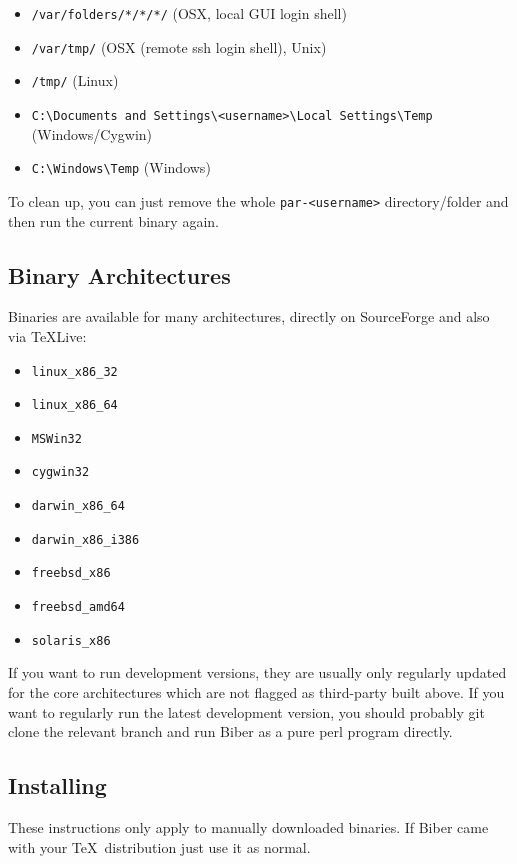 \documentclass{ltxdockit}
\begin{document}
\begin{itemize}
\item \verb+/var/folders/*/*/*/+ (OSX, local GUI login shell)
\item \verb+/var/tmp/+ (OSX (remote ssh login shell), Unix)
\item \verb+/tmp/+ (Linux)
\item \verb+C:\Documents and Settings\<username>\Local Settings\Temp+ (Windows/Cygwin)
\item \verb+C:\Windows\Temp+ (Windows)
\end{itemize}

\noindent To clean up, you can just remove the whole \verb+par-<username>+
directory/folder and then run the current binary again.

\subsection{Binary Architectures}

Binaries are available for many architectures, directly on SourceForge and
also via \TeX Live:

\begin{itemize}
\item \verb+linux_x86_32+
\item \verb+linux_x86_64+
\item \verb+MSWin32+
\item \verb+cygwin32+
\item \verb+darwin_x86_64+
\item \verb+darwin_x86_i386+
\item \verb+freebsd_x86+\tpb
\item \verb+freebsd_amd64+\tpb
\item \verb+solaris_x86+\tpb
\end{itemize}

\noindent If you want to run development versions, they are usually only
regularly updated for the core architectures which are not flagged as
third-party built above. If you want to regularly run the latest
development version, you should probably git clone the relevant branch and
run Biber as a pure perl program directly.

\subsection{Installing}

These instructions only apply to manually downloaded binaries. If
Biber came with your \TeX\ distribution just use it as normal.
\end{document}
